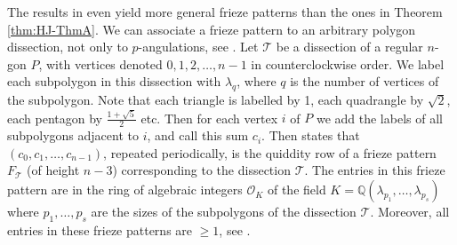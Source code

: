 \documentclass[11pt,a4paper]{amsart}
\theoremstyle{definition}
\numberwithin{equation}{section}
\begin{document}
The results in \cite{HJ17} even yield more general frieze patterns than the ones in Theorem \ref{thm:HJ-ThmA}. We can 
associate a frieze pattern to an arbitrary polygon dissection, not only to $p$-angulations, see \cite[Construction 0.3]{HJ17}. 
Let $\mathcal{T}$ 
be a dissection of a regular $n$-gon $P$, with vertices denoted $0,1,2,\ldots,n-1$ in counterclockwise order. 
We label each subpolygon in this dissection with $\lambda_q$, where $q$
is the number of vertices of the subpolygon. Note that each triangle is labelled by 1, each quadrangle by 
$\sqrt{2}$, each pentagon by $\frac{1+\sqrt{5}}{2}$ etc. 
Then for each vertex $i$ of $P$ we add the labels of all subpolygons adjacent to $i$, and call this sum
$c_i$. Then \cite[Theorem B]{HJ17} states that $(c_0,c_1,\ldots,c_{n-1})$, repeated periodically, is the quiddity
row of a frieze pattern $F_{\mathcal{T}}$ (of height $n-3$) corresponding to the dissection $\mathcal{T}$. The entries in this frieze pattern 
are in the ring of algebraic integers $\mathcal{O}_K$
of the field 
$K=\mathbb{Q}(\lambda_{p_1},\ldots,\lambda_{p_s})$ where $p_1,\ldots,p_s$ are the sizes of the subpolygons of the dissection $\mathcal{T}$. Moreover, all entries in these frieze patterns
are $\ge 1$, see \cite[Lemma 3.3]{HJ17}. 
\end{document}

